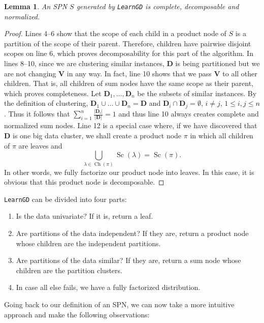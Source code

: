 \documentclass{amsart}
\DeclareMathOperator*{\Ch}{\text{Ch}}
\DeclareMathOperator*{\Sc}{\text{Sc}}
\theoremstyle{plain}
\newcounter{dummy-def}\numberwithin{dummy-def}{section}
\newcounter{dummy-thm}\numberwithin{dummy-thm}{section}
\newcounter{dummy-prop}\numberwithin{dummy-prop}{section}
\newcounter{dummy-corollary}\numberwithin{dummy-corollary}{section}
\newcounter{dummy-lemma}\numberwithin{dummy-lemma}{section}
\newtheorem{lemma}[dummy-lemma]{Lemma}
\newcounter{dummy-ex}\numberwithin{dummy-ex}{section}
\newcounter{dummy-eg}\numberwithin{dummy-eg}{section}
\numberwithin{equation}{section}
\newcommand{\set}[1]{\mathbf{#1}}
\newcommand{\code}[1]{\lstinline[mathescape=true]{#1}}
\begin{document}
\begin{lemma}
  An SPN $S$ generated by \code{LearnGD} is complete, decomposable and normalized.
\end{lemma}
\begin{proof}
  Lines 4--6 show that the scope of each child in a product node of $S$ is a partition of the scope
  of their parent. Therefore, children have pairwise disjoint scopes on line 6, which proves
  decomposability for this part of the algorithm. In lines 8--10, since we are clustering similar
  instances, $\set{D}$ is being partitioned but we are not changing $\set{V}$ in any way. In fact,
  line 10 shows that we pass $\set{V}$ to all other children. That is, all children of sum nodes
  have the same scope as their parent, which proves completeness.  Let $\set{D}_1,\ldots,\set{D}_n$
  be the subsets of similar instances. By the definition of clustering, $\set{D}_1\cup\ldots\cup
  \set{D}_n=\set{D}$ and $\set{D}_i\cap \set{D}_j= \emptyset$, $i\neq j$, $1\leq i,j\leq n$. Thus
  it follows that $\sum_{i=1}^n \frac{|\set{D}_i|}{|\set{D}|}=1$ and thus line 10 always creates
  complete and normalized sum nodes. Line 12 is a special case where, if we have discovered that
  $\set{D}$ is one big data cluster, we shall create a product node $\pi$ in which all children of
  $\pi$ are leaves and \begin{equation*} \bigcup_{\lambda\in\Ch(\pi)} \Sc(\lambda) = \Sc(\pi).
  \end{equation*} In other words, we fully factorize our product node into leaves. In this case, it
  is obvious that this product node is decomposable.
\end{proof}

\code{LearnGD} can be divided into four parts:

\begin{enumerate}
  \item Is the data univariate? If it is, return a leaf.
  \item Are partitions of the data independent? If they are, return a product node whose children
    are the independent partitions.
  \item Are partitions of the data similar? If they are, return a sum node whose children are the
    partition clusters.
  \item In case all else fails, we have a fully factorized distribution.
\end{enumerate}

Going back to our definition of an SPN, we can now take a more intuitive approach and make the
following observations:
\end{document}
